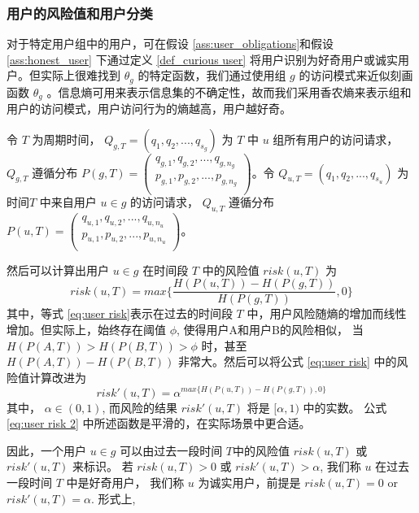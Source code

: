 \subsubsection{用户的风险值和用户分类}
对于特定用户组中的用户，可在假设 \ref{ass:user_obligations}和假设 \ref{ass:honest_user} 下通过定义 \ref{def_curious user} 将用户识别为好奇用户或诚实用户。但实际上很难找到 $\theta_g$ 的特定函数，我们通过使用组 $g$ 的访问模式来近似刻画函数 $\theta_g$ 。信息熵可用来表示信息集的不确定性，故而我们采用香农熵来表示组和用户的访问模式，用户访问行为的熵越高，用户越好奇。

令 $T$ 为周期时间， $Q_{g,T}=(q_1, q_2,...,q_{s_g})$ 为 $T$ 中 $u$ 组所有用户的访问请求， $Q_{g,T}$ 遵循分布
$P(g,T)=
(
\begin{array}{l}
q_{g,1},  q_{g,2}, ...,q_{g,n_g}\\
p_{g,1},  p_{g,2}, ...,p_{g,n_g}\\
\end{array}
)
$。令 $Q_{u,T}=(q_1, q_2,...,q_{s_u})$ 为 时间$T$ 中来自用户 $u \in g$ 的访问请求， $Q_{u,T}$ 遵循分布
$P(u,T)=
(
\begin{array}{l}
q_{u,1},  q_{u,2}, ...,q_{u,n_u}\\
p_{u,1},  p_{u,2}, ...,p_{u,n_u}\\
\end{array}
)
$。

然后可以计算出用户 $u \in g$ 在时间段 $T$ 中的风险值 $risk(u,T)$ 为
\begin{equation}\label{eq:user risk}
risk(u,T)=max \{\frac{H(P(u,T))-H(P(g,T))}{H(P(g,T))},0\}
\end{equation}
其中，等式 \ref{eq:user risk}表示在过去的时间段 $T$ 中，用户风险随熵的增加而线性增加。但实际上，始终存在阈值 $\phi$, 使得用户A和用户B的风险相似， 当 $H(P(A,T))>H(P(B,T))>\phi$ 时，甚至 $H(P(A,T))-H(P(B,T))$ 非常大。然后可以将公式 \ref{eq:user risk} 中的风险值计算改进为
\begin{equation}\label{eq:user risk 2}
risk'(u,T)=\alpha ^ {max \{H(P(u,T))-H(P(g,T)),0\}}
\end{equation}
其中， $\alpha \in (0,1)$, 而风险的结果 $risk'(u,T)$ 将是 $[\alpha, 1)$ 中的实数。 公式\ref{eq:user risk 2} 中所述函数是平滑的，在实际场景中更合适。

因此，一个用户 $u \in g$ 可以由过去一段时间 $T$中的风险值 $risk(u,T)$ 或 $risk'(u,T)$ 来标识。 若 $risk(u,T) > 0$ 或 $risk'(u,T)>\alpha$, 我们称 $u$ 在过去一段时间 $T$ 中是好奇用户， 我们称 $u$ 为诚实用户，前提是  $risk(u,T) = 0$ or $risk'(u,T)=\alpha$. 形式上,

